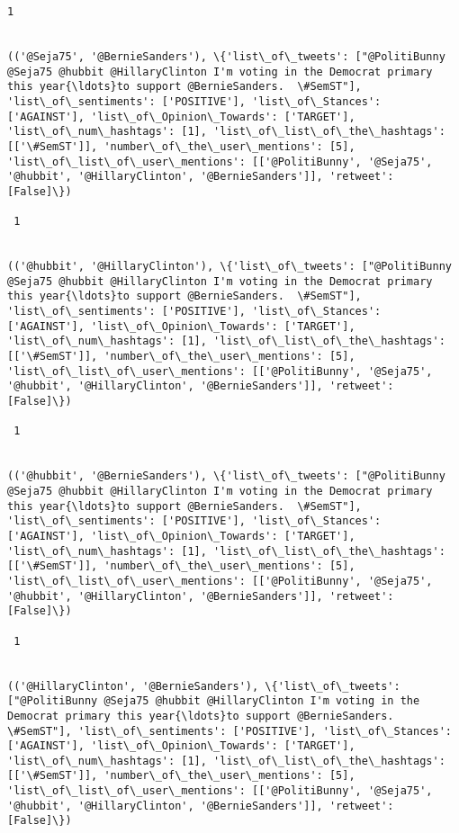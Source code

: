 \documentclass[11pt]{article}
\begin{document}
\begin{Verbatim}[commandchars=\\\{\}]
 1
 

(('@Seja75', '@BernieSanders'), \{'list\_of\_tweets': ["@PolitiBunny @Seja75 @hubbit @HillaryClinton I'm voting in the Democrat primary this year{\ldots}to support @BernieSanders.  \#SemST"], 'list\_of\_sentiments': ['POSITIVE'], 'list\_of\_Stances': ['AGAINST'], 'list\_of\_Opinion\_Towards': ['TARGET'], 'list\_of\_num\_hashtags': [1], 'list\_of\_list\_of\_the\_hashtags': [['\#SemST']], 'number\_of\_the\_user\_mentions': [5], 'list\_of\_list\_of\_user\_mentions': [['@PolitiBunny', '@Seja75', '@hubbit', '@HillaryClinton', '@BernieSanders']], 'retweet': [False]\})

 1
 

(('@hubbit', '@HillaryClinton'), \{'list\_of\_tweets': ["@PolitiBunny @Seja75 @hubbit @HillaryClinton I'm voting in the Democrat primary this year{\ldots}to support @BernieSanders.  \#SemST"], 'list\_of\_sentiments': ['POSITIVE'], 'list\_of\_Stances': ['AGAINST'], 'list\_of\_Opinion\_Towards': ['TARGET'], 'list\_of\_num\_hashtags': [1], 'list\_of\_list\_of\_the\_hashtags': [['\#SemST']], 'number\_of\_the\_user\_mentions': [5], 'list\_of\_list\_of\_user\_mentions': [['@PolitiBunny', '@Seja75', '@hubbit', '@HillaryClinton', '@BernieSanders']], 'retweet': [False]\})

 1
 

(('@hubbit', '@BernieSanders'), \{'list\_of\_tweets': ["@PolitiBunny @Seja75 @hubbit @HillaryClinton I'm voting in the Democrat primary this year{\ldots}to support @BernieSanders.  \#SemST"], 'list\_of\_sentiments': ['POSITIVE'], 'list\_of\_Stances': ['AGAINST'], 'list\_of\_Opinion\_Towards': ['TARGET'], 'list\_of\_num\_hashtags': [1], 'list\_of\_list\_of\_the\_hashtags': [['\#SemST']], 'number\_of\_the\_user\_mentions': [5], 'list\_of\_list\_of\_user\_mentions': [['@PolitiBunny', '@Seja75', '@hubbit', '@HillaryClinton', '@BernieSanders']], 'retweet': [False]\})

 1
 

(('@HillaryClinton', '@BernieSanders'), \{'list\_of\_tweets': ["@PolitiBunny @Seja75 @hubbit @HillaryClinton I'm voting in the Democrat primary this year{\ldots}to support @BernieSanders.  \#SemST"], 'list\_of\_sentiments': ['POSITIVE'], 'list\_of\_Stances': ['AGAINST'], 'list\_of\_Opinion\_Towards': ['TARGET'], 'list\_of\_num\_hashtags': [1], 'list\_of\_list\_of\_the\_hashtags': [['\#SemST']], 'number\_of\_the\_user\_mentions': [5], 'list\_of\_list\_of\_user\_mentions': [['@PolitiBunny', '@Seja75', '@hubbit', '@HillaryClinton', '@BernieSanders']], 'retweet': [False]\})


\end{Verbatim}
\end{document}

